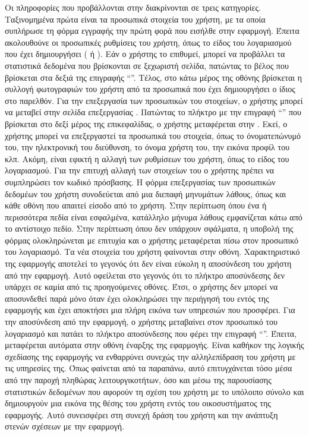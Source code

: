 Οι πληροφορίες που προβάλλονται στην  διακρίνονται σε τρεις κατηγορίες. Ταξινομημένα πρώτα είναι τα προσωπικά στοιχεία του χρήστη, με τα οποία συπλήρωσε τη φόρμα εγγραφής την πρώτη φορά που εισήλθε στην εφαρμογή. Έπειτα ακολουθούνε οι προσωπικές ρυθμίσεις του χρήστη, όπως το είδος του λογαριασμού που έχει δημιουργήσει ( ή ). Εάν ο χρήστης το επιθυμεί, μπορεί να προβάλλει τα στατιστικά δεδομένα που βρίσκονται σε ξεχωριστή σελίδα, πατώντας το βέλος που βρίσκεται στα δεξιά της επιγραφής ``\textit{}''. Τέλος, στο κάτω μέρος της οθόνης βρίσκεται η συλλογή φωτογραφιών του χρήστη από τα προσωπικά  που έχει δημιουργήσει ο ίδιος στο παρελθόν.
\newline
\indent
Για την επεξεργασία των προσωπικών του στοιχείων, ο χρήστης μπορεί να μεταβεί στην σελίδα επεξεργασίας . Πατώντας το πλήκτρο με την επιγραφή ``\textit{}'' που βρίσκεται στο δεξί μέρος της επικεφαλίδας, ο χρήστης μεταφέρεται στην . Εκεί, ο χρήστης μπορεί να επεξεργαστεί τα προσωπικά του στοιχεία, όπως το όνοματεπώνυμό του, την ηλεκτρονική του διεύθυνση, το όνομα χρήστη του, την εικόνα προφίλ του κλπ. Ακόμη, είναι εφικτή η αλλαγή των ρυθμίσεων του χρήστη, όπως το είδος του λογαριασμού. Για την επιτυχή αλλαγή των στοιχείων του ο χρήστης πρέπει να συμπληρώσει τον κωδικό πρόσβασης. Η φόρμα επεξεργασίας των προσωπικών δεδομέων του χρήστη συνοδεύεται από μια διεπαφή μηνυμάτων λάθους, όπως και κάθε οθόνη που απαιτεί είσοδο από το χρήστη. Στην περίπτωση όπου ένα ή περισσότερα πεδία είναι εσφαλμένα, κατάλληλο μήνυμα λάθους εμφανίζεται κάτω από το αντίστοιχο πεδίο. Στην περίπτωση όπου δεν υπάρχουν σφάλματα, η υποβολή της φόρμας ολοκληρώνεται με επιτυχία και ο χρήστης μεταφέρεται πίσω στον προσωπικό του λογαριασμό. Τα νέα στοιχεία του χρήστη φαίνονται στην οθόνη.
\newline
\indent
Χαρακτηριστικό της εφαρμογής αποτελεί το γεγονός ότι δεν είναι εύκολη η αποσύνδεση του χρήστη από την εφαρμογή. Αυτό οφείλεται στο γεγονός ότι το πλήκτρο αποσύνδεσης δεν υπάρχει σε καμία από τις προηγούμενες οθόνες. Έτσι, ο χρήστης δεν μπορεί να αποσυνδεθεί παρά μόνο όταν έχει ολοκληρώσει την περιήγησή του εντός της εφαρμογής και έχει αποκτήσει μια πλήρη εικόνα των υπηρεσιών που προσφέρει. Για την αποσύνδεση από την εφαρμογή, ο χρήστης μεταβαίνει στον προσωπικό του λογαριασμό και πατάει το πλήκτρο αποσύνδεσης που φέρει την επιγραφή ``\textit{}''. Έπειτα, μεταφέρεται αυτόματα στην οθόνη έναρξης της εφαρμογής.
\newline
\indent
Είναι καθήκον της λογικής σχεδίασης της εφαρμογής να ενθαρρύνει συνεχώς την αλληλεπίδραση του χρήστη με τις υπηρεσίες της. Όπως φαίνεται από τα παραπάνω, αυτό επιτυγχάνεται τόσο μέσα από την παροχή πληθώρας λειτουργικοτήτων, όσο και μέσω της παρουσίασης στατιστικών δεδομένων που αφορούν τη σχέση του χρήστη με το υπόλοιπο σύνολο και δημιουργούν μια εικόνα της θέσης του χρήστη εντός του οικοσυστήματος της εφαρμογής. Αυτό συνεισφέρει στη συνεχή δράση του χρήστη και την ανάπτυξη στενών σχέσεων με την εφαρμογή. 



